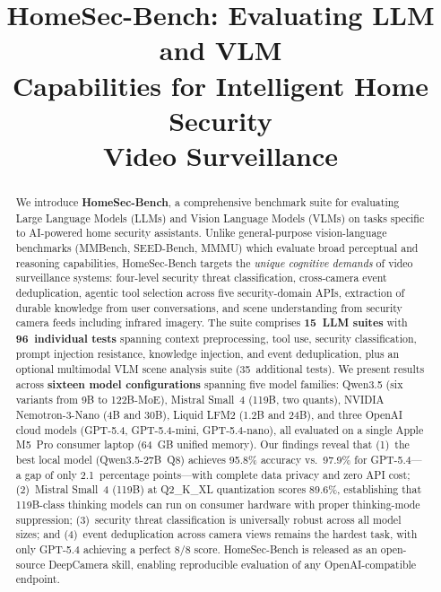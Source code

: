 \documentclass[onecolumn,10pt]{IEEEtran}
\begin{document}
\title{HomeSec-Bench: Evaluating LLM and VLM\\
Capabilities for Intelligent Home Security\\Video Surveillance}

\author{
}

\maketitle


\begin{abstract}
We introduce \textbf{HomeSec-Bench}, a comprehensive benchmark suite for
evaluating Large Language Models (LLMs) and Vision Language Models (VLMs) on
tasks specific to AI-powered home security assistants. Unlike general-purpose
vision-language benchmarks (MMBench, SEED-Bench, MMMU) which evaluate broad
perceptual and reasoning capabilities, HomeSec-Bench targets the
\emph{unique cognitive demands} of video surveillance systems: four-level
security threat classification, cross-camera event deduplication, agentic
tool selection across five security-domain APIs, extraction of durable
knowledge from user conversations, and scene understanding from security
camera feeds including infrared imagery. The suite comprises
\textbf{15~LLM suites} with \textbf{96~individual tests} spanning context
preprocessing, tool use, security classification, prompt injection resistance,
knowledge injection, and event deduplication, plus an optional multimodal
VLM scene analysis suite (35~additional tests). We present results across
\textbf{sixteen model configurations} spanning five model families: Qwen3.5
(six variants from 9B to 122B-MoE), Mistral Small~4 (119B, two quants),
NVIDIA Nemotron-3-Nano (4B and 30B), Liquid LFM2 (1.2B and 24B), and
three OpenAI cloud models (GPT-5.4, GPT-5.4-mini, GPT-5.4-nano), all
evaluated on a single Apple M5~Pro consumer laptop (64~GB unified memory).
Our findings reveal that (1)~the best local model (Qwen3.5-27B~Q8) achieves
95.8\% accuracy vs.\ 97.9\% for GPT-5.4---a gap of only 2.1~percentage
points---with complete data privacy and zero API cost; (2)~Mistral
Small~4 (119B) at Q2\_K\_XL quantization scores 89.6\%, establishing
that 119B-class thinking models can run on consumer hardware with
proper thinking-mode suppression; (3)~security threat classification
is universally robust across all model sizes; and (4)~event deduplication
across camera views remains the hardest task, with only GPT-5.4
achieving a perfect 8/8 score. HomeSec-Bench is released as an
open-source DeepCamera skill, enabling reproducible evaluation of any
OpenAI-compatible endpoint.
\end{abstract}
\end{document}
